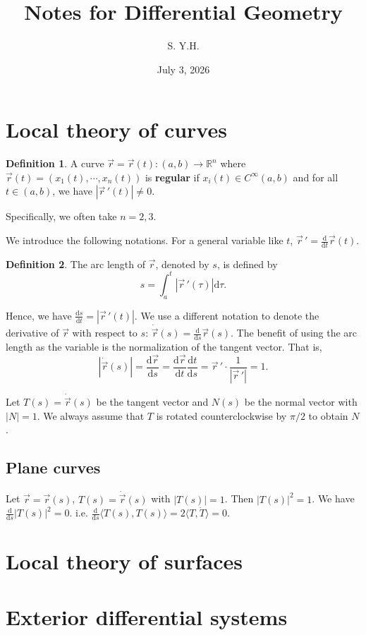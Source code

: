 \documentclass[12pt]{article} %
\theoremstyle{definition}
\newtheorem{defn}{Definition}[subsection]
\newcommand{\R}{\mathbb{R}}
\newcommand{\der}{\mathrm{d}}
\newcommand{\vr}{\vec{r}}
\begin{document}
\title{Notes for Differential Geometry}
\author{S. Y.H.}
\date{July 3, 2026}

\maketitle

\newpage
\tableofcontents

\newpage
\section{Local theory of curves} 

\begin{defn}
    A curve \(\vr=\vr(t)\colon (a,b)\rightarrow\R^n\) where \(\vr(t)=(x_1(t),\cdots,x_n(t))\) is \textbf{regular} if 
    \(x_i(t)\in C^{\infty}(a,b)\) and for all \(t\in(a,b)\), we have \(\left|\vr\,'(t)\right|\neq 0\).
\end{defn}

Specifically, we often take \(n=2,3\).

We introduce the following notations. For a general variable like \(t\), \(\vr\,'=\frac{\der}{\der t}\vr(t)\).

\begin{defn}
    The arc length of \(\vr\), denoted by \(s\), is defined by
    \[s=\int_{a}^{t}{\left|\vr\,'(\tau)\right|\der\tau}.\]
\end{defn}

Hence, we have \(\frac{\der s}{\der t}=\left|\vr\,'(t)\right|.\)
We use a different notation to denote the derivative of \(\vr\) with respect to \(s\): \(\dot{\vr}(s)=\frac{\der}{\der s}\vr(s)\).
The benefit of using the arc length as the variable is the normalization of the tangent vector. That is,
\[\left|\dot{\vr}(s)\right|=\dfrac{\der \vr}{\der s}=\dfrac{\der \vr}{\der t}\dfrac{\der t}{\der s}=\vr\,'\cdot\dfrac{1}{\left|\vr\,'\right|}=1.\]

Let \(T(s)=\dot{\vr}(s)\) be the tangent vector and \(N(s)\) be the normal vector with \(\left|N\right|=1\).
We always assume that \(T\) is rotated counterclockwise by \(\pi/2\) to obtain \(N\).

\subsection{Plane curves}
Let \(\vr=\vr(s)\), \(T(s)=\dot{\vr}(s)\) with \(\left|T(s)\right|=1\).
Then \(\left|T(s)\right|^2=1\). We have \(\frac{\der}{\der s}\left|T(s)\right|^2=0\). i.e. \(\frac{\der}{\der s}\langle T(s),T(s)\rangle=2\langle T,\dot{T}\rangle=0\).
\newpage
\section{Local theory of surfaces}
    

\newpage
\section{Exterior differential systems}

\newpage
\end{document}
